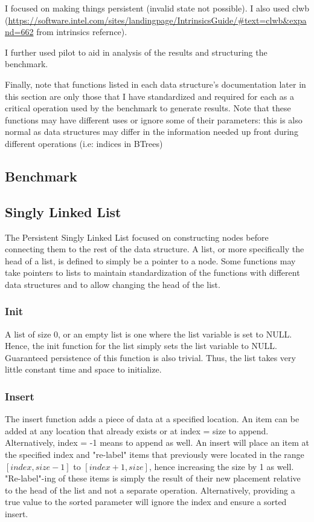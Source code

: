 \documentclass[twocolumn]{article}
\begin{document}
I focused on making things persistent (invalid state not possible). I also
used clwb
(\url{https://software.intel.com/sites/landingpage/IntrinsicsGuide/#text=clwb&expand=662}
from intrinsics refernce).

I further used pilot to aid in analysis of the results and structuring the
benchmark.

Finally, note that functions listed in each data structure's documentation later
in this section are only those that I have standardized and required for each as
a critical operation used by the benchmark to generate results. Note that these
functions may have different uses or ignore some of their parameters: this is
also normal as data structures may differ in the information needed up front
during different operations (i.e: indices in BTrees)

\subsection{Benchmark}

\subsection{Singly Linked List}

The Persistent Singly Linked List focused on constructing nodes before
connecting them to the rest of the data structure. A list, or more specifically
the head of a list, is defined to simply be a pointer to a node. Some functions
may take pointers to lists to maintain standardization of the functions with
different data structures and to allow changing the head of the list.

\subsubsection{Init}

A list of size 0, or an empty list is one where the list variable is set to
NULL. Hence, the init function for the list simply sets the list variable to
NULL. Guaranteed persistence of this function is also trivial. Thus, the list
takes very little constant time and space to initialize.

\subsubsection{Insert}

The insert function adds a piece of data at a specified location. An item can be
added at any location that already exists or at index = size to append.
Alternatively, index = -1 means to append as well. An insert will place an item
at the specified index and "re-label" items that previously were located in the
range $[index,size-1]$ to $[index+1,size]$, hence increasing the size by 1 as
well. "Re-label"-ing of these items is simply the result of their new placement
relative to the head of the list and not a separate operation. Alternatively,
providing a true value to the sorted parameter will ignore the index and ensure
a sorted insert.
\end{document}
